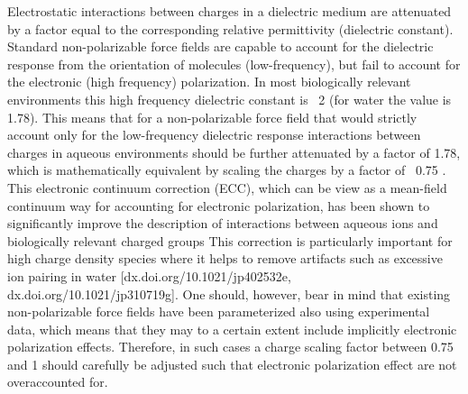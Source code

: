 \documentclass[journal=jctcce,manuscript=article]{achemso}
\begin{document}

Electrostatic interactions between charges in a dielectric medium are attenuated by a factor equal to the
corresponding relative permittivity (dielectric constant). Standard non-polarizable force fields are capable to
account for the dielectric response from the orientation of molecules (low-frequency), but fail to account for the electronic (high frequency) polarization.
In most biologically relevant environments this high frequency dielectric constant is ~2 (for water the value is 1.78).
This means that for a non-polarizable force field that would strictly account only for the low-frequency dielectric response
interactions between charges in aqueous environments should be further attenuated by a factor of 1.78, which is mathematically
equivalent by scaling the charges by a factor of ~0.75 \cite{leontyev09,leontyev14}. 
This electronic continuum correction (ECC), which can be view as a mean-field continuum way for accounting for electronic polarization,
has been shown to significantly improve the description of interactions between aqueous ions and biologically relevant charged groups \cite{pluharova13,kohagen14,kohagen14b,melcr18,xie16,kroutil17,bruce18}
This correction is particularly important for high charge density species where it helps to remove artifacts such as excessive ion pairing in water [dx.doi.org/10.1021/jp402532e, dx.doi.org/10.1021/jp310719g]. One should, however, bear in mind that existing non-polarizable force fields have been parameterized also using experimental data, which means that they may to a certain extent include implicitly electronic polarization effects. Therefore, in such cases a charge scaling factor between 0.75 and 1 should carefully be adjusted such that electronic polarization effect are not overaccounted for.    
\end{document}

